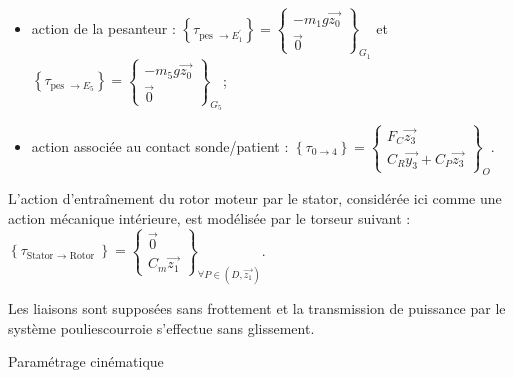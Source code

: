 \begin{itemize}
  \item[-] action de la pesanteur : $\left\{\tau_{\text {pes } \rightarrow E_{1}^{\prime}}\right\}=\left\{\begin{array}{c}-m_{1} g \overrightarrow{z_{0}} \\ \overrightarrow{0}\end{array}\right\}_{G_{1}}$ et $\left\{\tau_{\text {pes } \rightarrow E_{5}}\right\}=\left\{\begin{array}{c}-m_{5} g \overrightarrow{z_{0}} \\ \overrightarrow{0}\end{array}\right\}_{G_{5}}$;
  \item[-] action associée au contact sonde/patient : $\left\{\tau_{0 \rightarrow 4}\right\}=\left\{\begin{array}{c}F_{C} \overrightarrow{z_{3}} \\ C_{R} \overrightarrow{y_{3}}+C_{P} \overrightarrow{z_{3}}\end{array}\right\}_{O}$.
\end{itemize}

L'action d'entraînement du rotor moteur par le stator, considérée ici comme une action mécanique intérieure, est modélisée par le torseur suivant : $\left\{\tau_{\text {Stator } \rightarrow \text { Rotor }}\right\}=\left\{\begin{array}{c}\overrightarrow{0} \\ C_{m} \overrightarrow{z_{1}}\end{array}\right\}_{\forall P \in\left(D, \overrightarrow{z_{1}}\right)}$.

Les liaisons sont supposées sans frottement et la transmission de puissance par le système pouliescourroie s'effectue sans glissement.

Paramétrage cinématique


